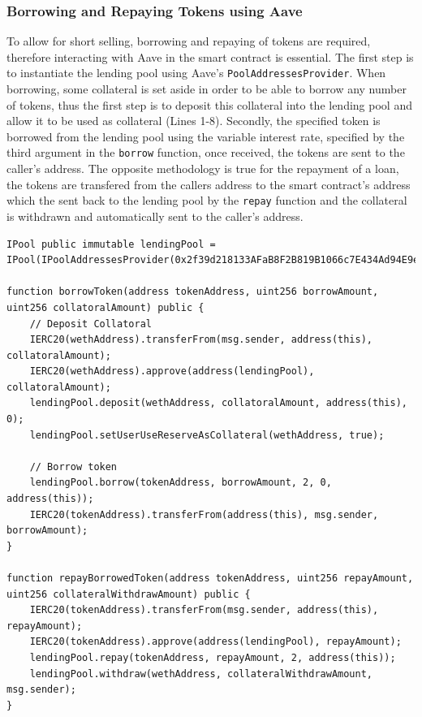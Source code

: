\subsubsection{Borrowing and Repaying Tokens using Aave}
To allow for short selling, borrowing and repaying of tokens are required, therefore interacting with Aave in the smart contract is essential. The first step is to instantiate the lending pool using Aave's \texttt{PoolAddressesProvider}. When borrowing, some collateral is set aside in order to be able to borrow any number of tokens, thus the first step is to deposit this collateral into the lending pool and allow it to be used as collateral (Lines 1-8). Secondly, the specified token is borrowed from the lending pool using the variable interest rate, specified by the third argument in the \texttt{borrow} function, once received, the tokens are sent to the caller's address. The opposite methodology is true for the repayment of a loan, the tokens are transfered from the callers address to the smart contract's address which the sent back to the lending pool by the \texttt{repay} function and the collateral is withdrawn and automatically sent to the caller's address.
\begin{lstlisting}[language=Solidity]
IPool public immutable lendingPool = IPool(IPoolAddressesProvider(0x2f39d218133AFaB8F2B819B1066c7E434Ad94E9e).getPool());

function borrowToken(address tokenAddress, uint256 borrowAmount, uint256 collatoralAmount) public {
    // Deposit Collatoral
    IERC20(wethAddress).transferFrom(msg.sender, address(this), collatoralAmount);
    IERC20(wethAddress).approve(address(lendingPool), collatoralAmount);
    lendingPool.deposit(wethAddress, collatoralAmount, address(this), 0);
    lendingPool.setUserUseReserveAsCollateral(wethAddress, true);

    // Borrow token
    lendingPool.borrow(tokenAddress, borrowAmount, 2, 0, address(this));
    IERC20(tokenAddress).transferFrom(address(this), msg.sender, borrowAmount);
}

function repayBorrowedToken(address tokenAddress, uint256 repayAmount, uint256 collateralWithdrawAmount) public {
    IERC20(tokenAddress).transferFrom(msg.sender, address(this), repayAmount);
    IERC20(tokenAddress).approve(address(lendingPool), repayAmount);
    lendingPool.repay(tokenAddress, repayAmount, 2, address(this));
    lendingPool.withdraw(wethAddress, collateralWithdrawAmount, msg.sender);
}
\end{lstlisting}

